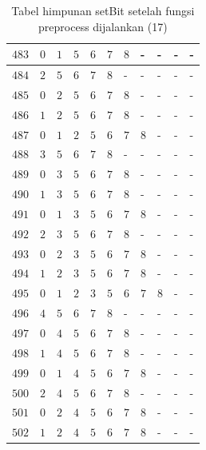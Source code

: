 \begin{appendices}
\begin{table}[H]
\begin{tabular} {|l|l|l|l|l|l|l|l|l|l|l|}
  		$ 483 $ & $ 0 $ &$ 1 $ &$ 5 $ &$ 6 $ &$ 7 $ &$ 8 $ & - &  - &  - &  -   \\ \hline
  		$ 484 $ & $ 2 $ &$ 5 $ &$ 6 $ &$ 7 $ &$ 8 $ & - &  - &  - &  - &  -   \\ \hline
  		$ 485 $ & $ 0 $ &$ 2 $ &$ 5 $ &$ 6 $ &$ 7 $ &$ 8 $ & - &  - &  - &  -   \\ \hline
  		$ 486 $ & $ 1 $ &$ 2 $ &$ 5 $ &$ 6 $ &$ 7 $ &$ 8 $ & - &  - &  - &  -   \\ \hline
  		$ 487 $ & $ 0 $ &$ 1 $ &$ 2 $ &$ 5 $ &$ 6 $ &$ 7 $ &$ 8 $ & - &  - &  -   \\ \hline
  		$ 488 $ & $ 3 $ &$ 5 $ &$ 6 $ &$ 7 $ &$ 8 $ & - &  - &  - &  - &  -   \\ \hline
  		$ 489 $ & $ 0 $ &$ 3 $ &$ 5 $ &$ 6 $ &$ 7 $ &$ 8 $ & - &  - &  - &  -   \\ \hline
  		$ 490 $ & $ 1 $ &$ 3 $ &$ 5 $ &$ 6 $ &$ 7 $ &$ 8 $ & - &  - &  - &  -   \\ \hline
  		$ 491 $ & $ 0 $ &$ 1 $ &$ 3 $ &$ 5 $ &$ 6 $ &$ 7 $ &$ 8 $ & - &  - &  -   \\ \hline
  		$ 492 $ & $ 2 $ &$ 3 $ &$ 5 $ &$ 6 $ &$ 7 $ &$ 8 $ & - &  - &  - &  -   \\ \hline
  		$ 493 $ & $ 0 $ &$ 2 $ &$ 3 $ &$ 5 $ &$ 6 $ &$ 7 $ &$ 8 $ & - &  - &  -   \\ \hline
  		$ 494 $ & $ 1 $ &$ 2 $ &$ 3 $ &$ 5 $ &$ 6 $ &$ 7 $ &$ 8 $ & - &  - &  -   \\ \hline
  		$ 495 $ & $ 0 $ &$ 1 $ &$ 2 $ &$ 3 $ &$ 5 $ &$ 6 $ &$ 7 $ &$ 8 $ & - &  -   \\ \hline
  		$ 496 $ & $ 4 $ &$ 5 $ &$ 6 $ &$ 7 $ &$ 8 $ & - &  - &  - &  - &  -   \\ \hline
  		$ 497 $ & $ 0 $ &$ 4 $ &$ 5 $ &$ 6 $ &$ 7 $ &$ 8 $ & - &  - &  - &  -   \\ \hline
  		$ 498 $ & $ 1 $ &$ 4 $ &$ 5 $ &$ 6 $ &$ 7 $ &$ 8 $ & - &  - &  - &  -   \\ \hline
  		$ 499 $ & $ 0 $ &$ 1 $ &$ 4 $ &$ 5 $ &$ 6 $ &$ 7 $ &$ 8 $ & - &  - &  -   \\ \hline
  		$ 500 $ & $ 2 $ &$ 4 $ &$ 5 $ &$ 6 $ &$ 7 $ &$ 8 $ & - &  - &  - &  -   \\ \hline
  		$ 501 $ & $ 0 $ &$ 2 $ &$ 4 $ &$ 5 $ &$ 6 $ &$ 7 $ &$ 8 $ & - &  - &  -   \\ \hline
  		$ 502 $ & $ 1 $ &$ 2 $ &$ 4 $ &$ 5 $ &$ 6 $ &$ 7 $ &$ 8 $ & - &  - &  -   \\ \hline  		
  	\end{tabular}\caption{Tabel himpunan setBit setelah fungsi preprocess dijalankan (17)}

\end{table}
\end{appendices}
